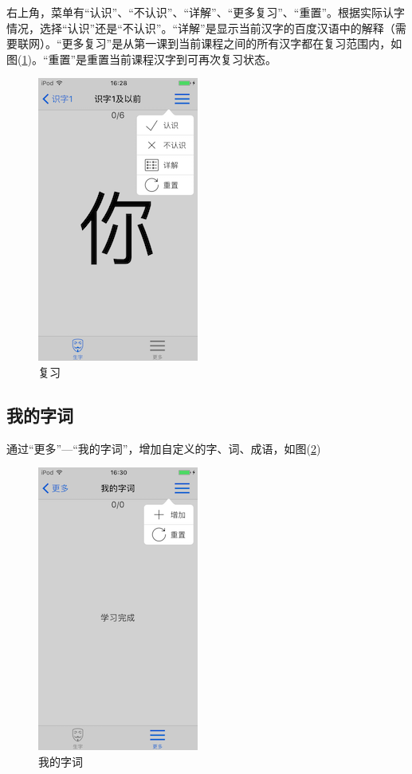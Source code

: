 右上角，菜单有“认识”、“不认识”、“详解”、“更多复习”、“重置”。根据实际认字情况，选择“认识”还是“不认识”。“详解”是显示当前汉字的百度汉语中的解释（需要联网）。“更多复习”是从第一课到当前课程之间的所有汉字都在复习范围内，如图(\ref{img7})。“重置”是重置当前课程汉字到可再次复习状态。
\begin{figure}[H]
	\centering
	\includegraphics{img/7.png}
	\caption{复习}
	\label{img7}
\end{figure}

\subsection{我的字词}
通过“更多”---“我的字词”，增加自定义的字、词、成语，如图(\ref{img8})
\begin{figure}[H]
	\centering
	\includegraphics{img/8.png}
	\caption{我的字词}
	\label{img8}
\end{figure}

